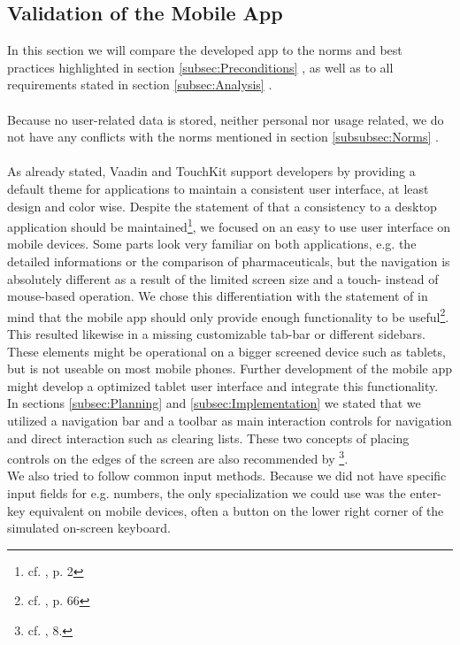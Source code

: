 \subsection{Validation of the Mobile App}
\label{subsec:Validation}
In this section we will compare the developed app to the norms and best practices highlighted in section \ref{subsec:Preconditions} , as well as to all requirements stated in section \ref{subsec:Analysis} .
\\
\\
Because no user-related data is stored, neither personal nor usage related, we do not have any conflicts with the norms mentioned in section \ref{subsubsec:Norms} .
\\
\\
As already stated, Vaadin and TouchKit support developers by providing a default theme for applications to maintain a consistent user interface, at least design and color wise. Despite the statement of \cite{Wessels.2011} that a consistency to a desktop application should be maintained\footnote{cf. \cite{Wessels.2011}, p. 2}, we focused on an easy to use user interface on mobile devices. Some parts look very familiar on both applications, e.g. the detailed informations or the comparison of pharmaceuticals, but the navigation is absolutely different as a result of the limited screen size and a touch- instead of mouse-based operation. We chose this differentiation with the statement of \cite{Lica.2010} in mind that the mobile app should only provide enough functionality to be useful\footnote{cf. \cite{Lica.2010}, p. 66}. This resulted likewise in a missing customizable tab-bar or different sidebars. These elements might be operational on a bigger screened device such as tablets, but is not useable on most mobile phones. Further development of the mobile app might develop a optimized tablet user interface and integrate this functionality.
\\
In sections \ref{subsec:Planning}  and \ref{subsec:Implementation}  we stated that we utilized a navigation bar and a toolbar as main interaction controls for navigation and direct interaction such as clearing lists. These two concepts of placing controls on the edges of the screen are also recommended by \cite{WorldWideWebConsortium.2008}\footnote{cf. \cite{WorldWideWebConsortium.2008}, 8.}.
\\
We also tried to follow common input methods. Because we did not have specific input fields for e.g. numbers, the only specialization we could use was the enter-key equivalent on mobile devices, often a button on the lower right corner of the simulated on-screen keyboard.
